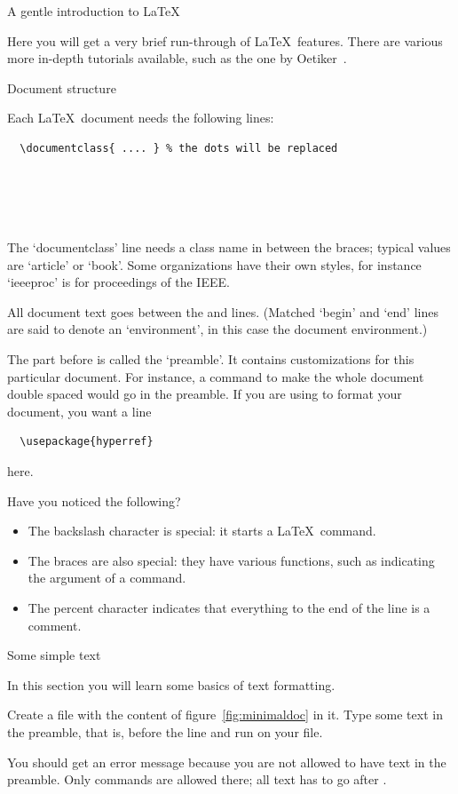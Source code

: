  {A gentle introduction to LaTeX}

Here you will get a very brief run-through of \LaTeX\ features. There
are various more in-depth tutorials available, such as the one by
Oetiker~\cite{Oetiker:LaTeXintro}.

 {Document structure}

Each \LaTeX\ document needs the following lines:
\begin{verbatim}
  \documentclass{ .... } % the dots will be replaced

  

    
\end{verbatim}
The `documentclass' line needs a class name in between the braces;
typical values are `article' or `book'. Some organizations have their
own styles, for instance `ieeeproc' is for proceedings of the IEEE.

All document text goes between the \verb++ and
\verb++ lines. (Matched `begin' and `end' lines are said
to denote an `environment', in this case the document environment.)

The part before \verb++ is called the `preamble'. It
contains customizations for this particular document. For instance, a
command to make the whole document double spaced would go in the
preamble. If you are using  to format your document, you
want a line
\begin{verbatim}
  \usepackage{hyperref}
\end{verbatim}
here.

Have you noticed the following?
\begin{itemize}
\item The backslash character is special: it starts a \LaTeX\ command.
\item The braces are also special: they have various functions, such
  as indicating the argument of a command.
\item The percent character indicates that everything to the end of
  the line is a comment.
\end{itemize}

 {Some simple text}

\begin{purpose}
  In this section you will learn some basics of text formatting.
\end{purpose}

\begin{exercise}
Create a file  with the content of
figure~\ref{fig:minimaldoc} in it. Type some text in the preamble,
that is, before the
 line and run  on your file.
\end{exercise}
\begin{outcome}
{You should get an error message because you are not allowed to have text
in the preamble. Only commands are allowed there; all text has to go after
.}
\end{outcome}


